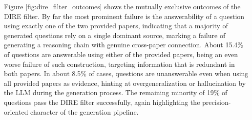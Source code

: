 Figure \ref{fig:dire_filter_outcomes} shows the mutually exclusive outcomes of the DIRE filter. By far the most prominent failure is the answerability of a question using exactly one of the two provided papers, indicating that a majority of generated questions rely on a single dominant source, marking a failure of generating a reasoning chain with genuine cross-paper connection. About 15.4\% of questions are answerable using either of the provided papers, being an even worse failure of such construction, targeting information that is redundant in both papers. In about  8.5\% of cases, questions are unanswerable even when using all provided papers as evidence, hinting at overgeneralization or hallucination by the LLM during the generation process. The remaining minority of 19\% of questions pass the DIRE filter successfully, again highlighting the precision-oriented character of the generation pipeline. 



